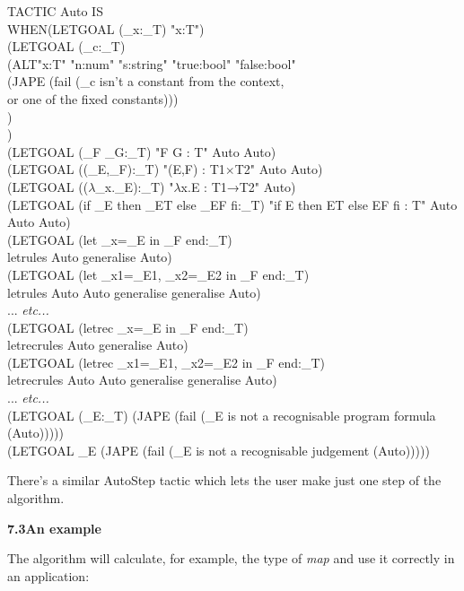 \documentclass[11pt]{book}
\newcommand{\tab}{\hspace{5mm}}
\begin{document}
TACTIC Auto IS\\
\tab WHEN\tab (LETGOAL (\_x:\_T) "x:T")\\
\tab \tab (LETGOAL (\_c:\_T) \\
\tab \tab \tab (ALT\tab "x:T" "n:num" "s:string" "true:bool" "false:bool"\\
\tab \tab \tab \tab (JAPE (fail (\_c isn't a constant from the context, \\
\tab \tab \tab \tab \tab \tab \tab or one of the fixed constants))) \\
\tab \tab \tab )\\
\tab \tab )\\
\tab \tab (LETGOAL (\_F \_G:\_T) "F G : T" Auto Auto)\\
\tab \tab (LETGOAL ((\_E,\_F):\_T) "(E,F) : T1$\times$T2" Auto Auto)\\
\tab \tab (LETGOAL (($\lambda$\_x.\_E):\_T) "$\lambda$x.E : T1→T2" Auto)\\
\tab \tab (LETGOAL (if \_E then \_ET else \_EF fi:\_T) "if E then ET else EF fi : T" Auto Auto Auto)\\
\tab \tab (LETGOAL (let \_x=\_E in \_F end:\_T) \\
\tab \tab \tab \tab letrules Auto generalise Auto)\\
\tab \tab (LETGOAL (let \_x1=\_E1, \_x2=\_E2 in \_F end:\_T) \\
\tab \tab \tab \tab letrules Auto Auto generalise generalise Auto)\\
\tab \tab ... \textit{etc...}\\
\tab \tab (LETGOAL (letrec \_x=\_E in \_F end:\_T) \\
\tab \tab \tab \tab letrecrules Auto generalise Auto)\\
\tab \tab (LETGOAL (letrec \_x1=\_E1, \_x2=\_E2 in \_F end:\_T) \\
\tab \tab \tab \tab letrecrules Auto Auto generalise generalise Auto)\\
\tab \tab ... \textit{etc...}\\
\tab \tab (LETGOAL (\_E:\_T) (JAPE (fail (\_E is not a recognisable program formula (Auto)))))\\
\tab \tab (LETGOAL \_E (JAPE (fail (\_E is not a recognisable judgement (Auto)))))


There's a similar AutoStep tactic which lets the user make just one step of the algorithm.


\textbf{{\large 7.3\tab An example}}


The algorithm will calculate, for example, the type of \textit{map} and use it correctly in an application:
\end{document}
